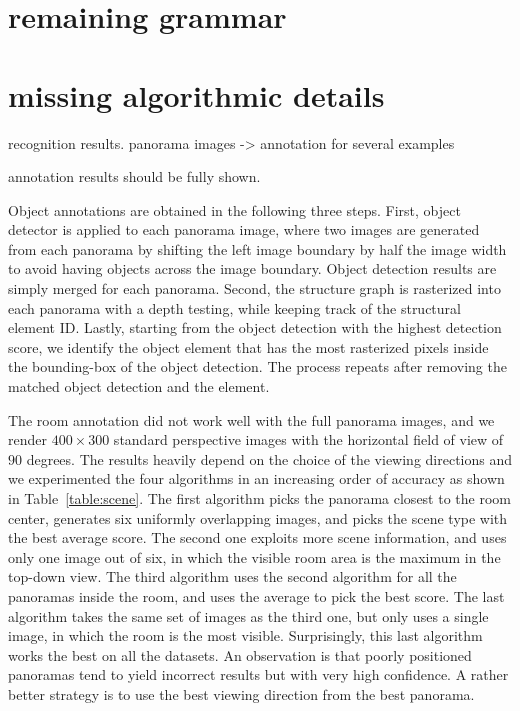 \section{remaining grammar }
\section{missing algorithmic details}

recognition results. panorama images -> annotation for several examples

        
annotation results should be fully shown.

        
Object annotations are obtained in the following three steps. First,
object detector is applied to each panorama image, where two images are
generated from each panorama by shifting the left image boundary by half
the image width to avoid having objects across the image
boundary. Object detection results are simply merged for each
panorama. Second, the structure graph is rasterized into each panorama
with a depth testing, while keeping track of the structural element
ID. Lastly, starting from the object detection with the highest
detection score, we identify the object element that has the most
rasterized pixels inside the bounding-box of the object detection. The
process repeats after removing the matched object detection and the element.

The room annotation did not work well with the full panorama images, and
we render $400\times 300$ standard perspective images with the
horizontal field of view of $90$ degrees. The results heavily depend on
the choice of the viewing directions and we experimented the four
algorithms in an increasing order of accuracy as shown in
Table~\ref{table:scene}. The first algorithm picks the panorama closest
to the room center, generates six uniformly overlapping images, and
picks the scene type with the best average score. The second one
exploits more scene information, and uses only one image out of six, in
which the visible room area is the maximum in the top-down view. The
third algorithm uses the second algorithm for all the panoramas inside
the room, and uses the average to pick the best score. The last
algorithm takes the same set of images as the third one, but only uses a
single image, in which the room is the most visible. Surprisingly, this
last algorithm works the best on all the datasets. An observation is
that poorly positioned panoramas tend to yield incorrect results but
with very high confidence. A rather better strategy is to use the best
viewing direction from the best panorama.





